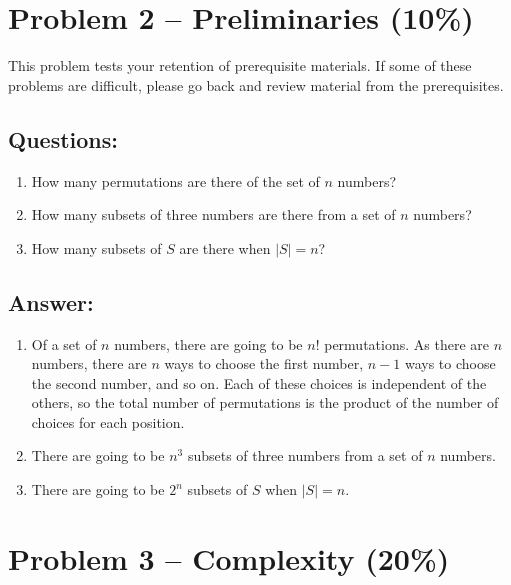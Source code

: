 \documentclass[12pt,letterpaper]{article}
\begin{document}
\section*{Problem 2 -- Preliminaries (10\%)}
This problem tests your retention of prerequisite materials.
If some of these problems are difficult, please go back and review material from the prerequisites.

\subsection*{Questions:}
\begin{enumerate}
    \item How many permutations are there of the set of $n$ numbers? 
    \item How many subsets of three numbers are there from a set of $n$ numbers?
    \item How many subsets of $S$ are there when $|S|=n$?
\end{enumerate}

\subsection*{Answer:}
\begin{enumerate}
    \item Of a set of $n$ numbers, there are going to be $n!$ permutations. 
    As there are $n$ numbers, there are $n$ ways to choose the first number, 
    $n-1$ ways to choose the second number, and so on. Each of these choices 
    is independent of the others, so the total number of permutations is the 
    product of the number of choices for each position. 
    \item There are going to be $n^3$ subsets of three numbers from a set of $n$ numbers.
    \item There are going to be $2^n$ subsets of $S$ when $|S|=n$.
\end{enumerate}

\newpage

\section*{Problem 3 -- Complexity (20\%)}
\end{document}

